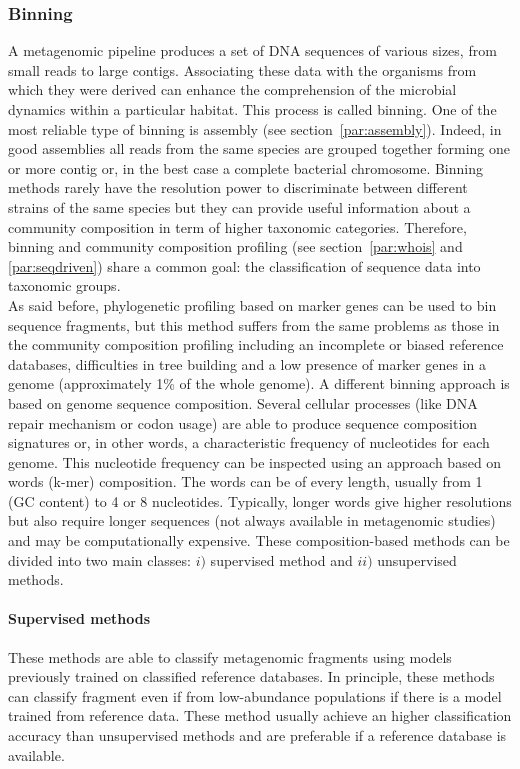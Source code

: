 \subsubsection{Binning}
A metagenomic pipeline produces a set of DNA sequences of various sizes, from small reads to large contigs. Associating these data with the organisms from which they were derived can enhance the comprehension of the microbial dynamics within a particular habitat. This process is called binning. One of the most reliable type of binning is assembly (see section~\ref{par:assembly}). Indeed, in good assemblies all reads from the same species are grouped together forming one or more contig or, in the best case a complete bacterial chromosome. Binning methods rarely have the resolution power to discriminate between different strains of the same species but they can provide useful information about a community composition in term of higher taxonomic categories. Therefore, binning and community composition profiling (see section~\ref{par:whois} and \ref{par:seqdriven}) share a common goal: the classification of sequence data into taxonomic groups.\\
As said before, phylogenetic profiling based on marker genes can be used to bin sequence fragments, but this method suffers from the same problems as those in the community composition profiling including an incomplete or biased reference databases, difficulties in tree building and a low presence of marker genes in a genome (approximately 1\% of the whole genome). A different binning approach is based on genome sequence composition. Several cellular processes (like DNA repair mechanism or codon usage) are able to produce sequence composition signatures or, in other words, a characteristic frequency of nucleotides for each genome. This nucleotide frequency can be inspected using an approach based on words (k-mer) composition. The words can be of every length, usually from 1 (GC content) to 4 or 8 nucleotides. Typically, longer words give higher resolutions but also require longer sequences (not always available in metagenomic studies) and may be computationally expensive. These composition-based methods can be divided into two main classes: $i)$ supervised method and $ii)$ unsupervised methods.\\

\paragraph{Supervised methods}
These methods are able to classify metagenomic fragments using models previously trained on classified reference databases. In principle, these methods can classify fragment even if from low-abundance populations if there is a model trained from reference data. These method usually achieve an higher classification accuracy than unsupervised methods and are preferable if a reference database is available.

